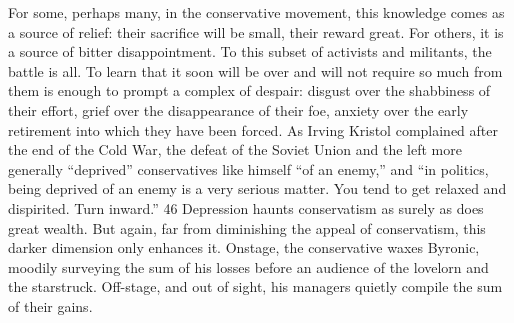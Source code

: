  \par 
For some, perhaps many, in the conservative movement, this knowledge comes as a source of relief: their sacrifice will be small, their reward great. For others, it is a source of bitter disappointment. To this subset of activists and militants, the battle is all. To learn that it soon will be over and will not require so much from them is enough to prompt a complex of despair: disgust over the shabbiness of their effort, grief over the disappearance of their foe, anxiety over the early retirement into which they have been forced. As Irving Kristol complained after the end of the Cold War, the defeat of the Soviet Union and the left more generally “deprived” conservatives like himself “of an enemy,” and “in politics, being deprived of an enemy is a very serious matter. You tend to get relaxed and dispirited. Turn inward.” 46 Depression haunts conservatism as surely as does great wealth. But again, far from diminishing the appeal of conservatism, this darker dimension only enhances it. Onstage, the conservative waxes Byronic, moodily surveying the sum of his losses before an audience of the lovelorn and the starstruck. Off-stage, and out of sight, his managers quietly compile the sum of their gains.